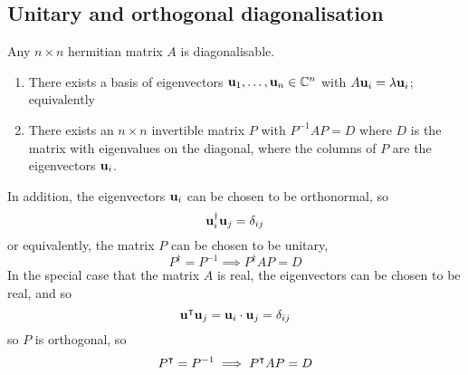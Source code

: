 \subsection{Unitary and orthogonal diagonalisation}
\begin{theorem}
	Any \(n\times n\) hermitian matrix \(A\) is diagonalisable.
	\begin{enumerate}
		\item There exists a basis of eigenvectors \(\vb u_1, \dots, \vb u_n \in \mathbb C^n\) with \(A\vb u_i = \lambda \vb u_i\); equivalently
		\item There exists an \(n \times n\) invertible matrix \(P\) with \(P^{-1}AP = D\) where \(D\) is the matrix with eigenvalues on the diagonal, where the columns of \(P\) are the eigenvectors \(\vb u_i\).
	\end{enumerate}
	In addition, the eigenvectors \(\vb u_i\) can be chosen to be orthonormal, so
	\[
		\vb u^\dagger_i \vb u_j = \delta_{ij}
	\]
	or equivalently, the matrix \(P\) can be chosen to be unitary,
	\[
		P^\dagger = P^{-1} \implies P^\dagger AP = D
	\]
	In the special case that the matrix \(A\) is real, the eigenvectors can be chosen to be real, and so
	\[
		\vb u^\intercal \vb u_j = \vb u_i \cdot \vb u_j = \delta_{ij}
	\]
	so \(P\) is orthogonal, so
	\[
		P^\intercal = P^{-1} \implies P^\intercal AP = D
	\]
\end{theorem}
